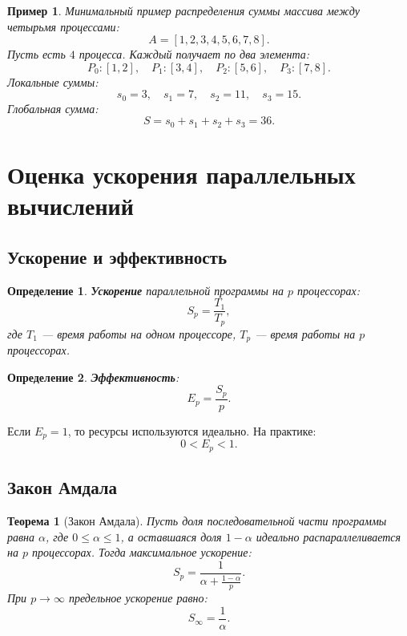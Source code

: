\documentclass[12pt,a4paper]{article}
\newtheorem{definition}{Определение}
\newtheorem{theorem}{Теорема}
\newtheorem{example}{Пример}
\begin{document}
\begin{example}
Минимальный пример распределения суммы массива между четырьмя процессами:
\[
A = [1,2,3,4,5,6,7,8].
\]
Пусть есть $4$ процесса. Каждый получает по два элемента:
\[
P_0: [1,2],\quad P_1: [3,4],\quad P_2: [5,6],\quad P_3: [7,8].
\]
Локальные суммы:
\[
s_0=3,\quad s_1=7,\quad s_2=11,\quad s_3=15.
\]
Глобальная сумма:
\[
S = s_0+s_1+s_2+s_3=36.
\]
\end{example}

\section{Оценка ускорения параллельных вычислений}

\subsection{Ускорение и эффективность}

\begin{definition}
\textbf{Ускорение} параллельной программы на $p$ процессорах:
\[
S_p = \frac{T_1}{T_p},
\]
где $T_1$ --- время работы на одном процессоре, $T_p$ --- время работы на $p$ процессорах.
\end{definition}

\begin{definition}
\textbf{Эффективность}:
\[
E_p = \frac{S_p}{p}.
\]
\end{definition}

Если $E_p=1$, то ресурсы используются идеально. На практике:
\[
0 < E_p < 1.
\]

\subsection{Закон Амдала}

\begin{theorem}[Закон Амдала]
Пусть доля последовательной части программы равна $\alpha$, где $0 \leq \alpha \leq 1$, а оставшаяся доля $1-\alpha$ идеально распараллеливается на $p$ процессорах. Тогда максимальное ускорение:
\[
S_p = \frac{1}{\alpha + \frac{1-\alpha}{p}}.
\]
При $p \to \infty$ предельное ускорение равно:
\[
S_{\infty} = \frac{1}{\alpha}.
\]
\end{theorem}
\end{document}
